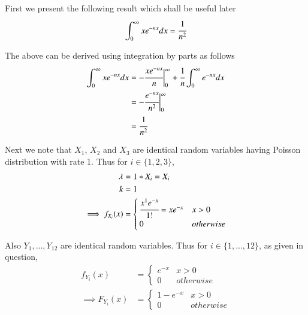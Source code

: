 \documentclass[journal,12pt,twocolumn]{IEEEtran}
\begin{document}
First we present the following result which shall be useful later
\begin{align}
    \int_0^{\infty} xe^{-nx}dx = \cfrac{1}{n^2}\label{integrationresult}
\end{align}

The above can be derived using integration by parts as follows
\begin{align}
    \int_0^{\infty} xe^{-nx} dx &= -\cfrac{xe^{-nx}}{n} \biggr \vert_0^{\infty} 
                                   + \cfrac{1}{n} \int_0^{\infty}e^{-nx}dx\\
                                &= -\cfrac{e^{-nx}}{n^2}\biggr \vert_0^{\infty}\\
                                &= \cfrac{1}{n^2}
\end{align}

Next we note that $X_1$, $X_2$ and $X_3$ are identical random variables having Poisson distribution with rate 1. Thus for $i \in \{1,2,3\}$,
\begin{align}
    \lambda &= 1*X_i = X_i\\
    k &= 1\\
    \implies f_{X_i}(x) &= 
    \begin{cases}
        \cfrac{x^1e^{-x}}{1!} = x e^{-x} &x > 0\\
        0                                &otherwise
    \end{cases}
\end{align}

Also $Y_1,...,Y_{12}$ are identical random variables. Thus for $i \in \{1,...,12\}$, as given in question,
\begin{align}
    f_{Y_i}(x) &= 
    \begin{cases}
        e^{-x} & x > 0\\
        0      & otherwise
    \end{cases}\\
    \implies F_{Y_i}(x) &= 
    \begin{cases}
        1-e^{-x} & x > 0\\
        0        & otherwise
    \end{cases}
\end{align}
\end{document}
